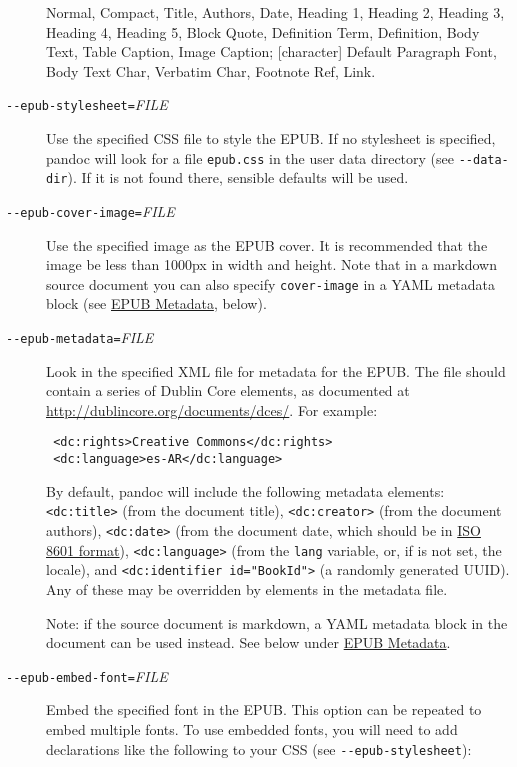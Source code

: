 \documentclass[]{article}
\begin{document}
\begin{description}
Normal, Compact, Title, Authors, Date, Heading 1, Heading 2, Heading 3,
Heading 4, Heading 5, Block Quote, Definition Term, Definition, Body
Text, Table Caption, Image Caption; {[}character{]} Default Paragraph
Font, Body Text Char, Verbatim Char, Footnote Ref, Link.
\item[\texttt{-{}-epub-stylesheet=}\emph{FILE}]
Use the specified CSS file to style the EPUB. If no stylesheet is
specified, pandoc will look for a file \texttt{epub.css} in the user
data directory (see \texttt{-{}-data-dir}). If it is not found there,
sensible defaults will be used.
\item[\texttt{-{}-epub-cover-image=}\emph{FILE}]
Use the specified image as the EPUB cover. It is recommended that the
image be less than 1000px in width and height. Note that in a markdown
source document you can also specify \texttt{cover-image} in a YAML
metadata block (see \hyperref[epub-metadata]{EPUB Metadata}, below).
\item[\texttt{-{}-epub-metadata=}\emph{FILE}]
Look in the specified XML file for metadata for the EPUB. The file
should contain a series of Dublin Core elements, as documented at
\url{http://dublincore.org/documents/dces/}. For example:

\begin{verbatim}
 <dc:rights>Creative Commons</dc:rights>
 <dc:language>es-AR</dc:language>
\end{verbatim}

By default, pandoc will include the following metadata elements:
\texttt{\textless{}dc:title\textgreater{}} (from the document title),
\texttt{\textless{}dc:creator\textgreater{}} (from the document
authors), \texttt{\textless{}dc:date\textgreater{}} (from the document
date, which should be in \href{http://www.w3.org/TR/NOTE-datetime}{ISO
8601 format}), \texttt{\textless{}dc:language\textgreater{}} (from the
\texttt{lang} variable, or, if is not set, the locale), and
\texttt{\textless{}dc:identifier id="BookId"\textgreater{}} (a randomly
generated UUID). Any of these may be overridden by elements in the
metadata file.

Note: if the source document is markdown, a YAML metadata block in the
document can be used instead. See below under
\hyperref[epub-metadata]{EPUB Metadata}.
\item[\texttt{-{}-epub-embed-font=}\emph{FILE}]
Embed the specified font in the EPUB. This option can be repeated to
embed multiple fonts. To use embedded fonts, you will need to add
declarations like the following to your CSS (see
\texttt{-{}-epub-stylesheet}):


\end{description}
\end{document}
